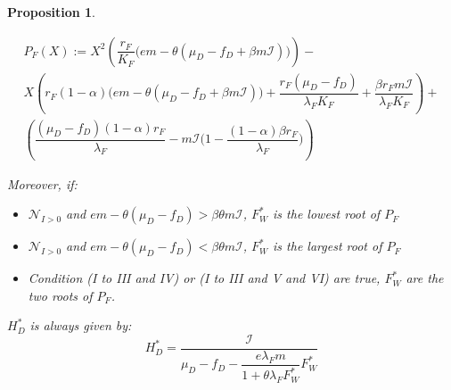 \documentclass{article}
\newcommand{\lfw}{\lambda_{F}}
\newcommand{\lfw}{\lambda_{F}}
\newcommand{\cI}{\mathcal{I}}
\newtheorem{prop}{Proposition}
\begin{document}
\begin{prop}
\begin{itemize}
\begin{multline*}
P_F(X) := X^2 \left(\dfrac{r_F}{K_F} \Big(em - \theta(\mu_D-f_D + \beta m \cI) \Big) \right) - \\ 
X \left(r_F (1-\alpha)   \Big(em - \theta(\mu_D-f_D + \beta m \cI)  \Big) + \dfrac{r_F(\mu_D-f_D)}{\lfw K_F} + \dfrac{\beta r_F m \cI}{\lfw K_F} \right) + \\
 \left(\dfrac{(\mu_D - f_D)(1-\alpha) r_F}{\lfw} - m\cI\Big(1 - \dfrac{(1-\alpha)\beta r_F}{\lfw} \Big) \right)
 \end{multline*}

Moreover, if:
\begin{itemize}
\item $\mathcal{N}_{I>0}$ and $em - \theta(\mu_D - f_D) > \beta \theta m \cI$, $F_W^*$ is the lowest root of $P_F$
\item $\mathcal{N}_{I>0}$ and $em - \theta(\mu_D - f_D) < \beta \theta m \cI$, $F_W^*$ is the largest root of $P_F$
\item Condition (I to III and IV) or (I to III and V and VI) are true, $F_W^*$ are the two roots of $P_F$.
\end{itemize}
$H_D^*$ is always given by:
$$
H_D^* = \dfrac{\cI}{\mu_D - f_D - \dfrac{e\lfw m }{1 + \theta \lfw F_W^*} F_W^*}
$$

\end{itemize}
\end{prop}
\end{document}
